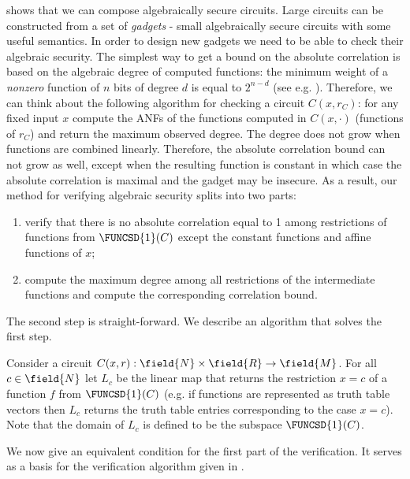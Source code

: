 
 shows that we can compose algebraically secure circuits. Large circuits can be constructed from a set of \emph{gadgets} - small algebraically secure circuits with some useful semantics. In order to design new gadgets we need to be able to check their algebraic security. The simplest way to get a bound on the absolute correlation is based on the algebraic degree of computed functions: the minimum weight of a \emph{nonzero} function of $n$ bits of degree $d$ is equal to $2^{n-d}$ (see e.g. \cite{Carlet}). Therefore, we can think about the following algorithm for checking a circuit $C(x,r_C)$: for any fixed input $x$ compute the ANFs of the functions computed in $C(x,\cdot)$ (functions of $r_C$) and return the maximum observed degree. The degree does not grow when functions are combined linearly. Therefore, the absolute correlation bound can not grow as well, except when the resulting function is constant in which case the absolute correlation is maximal and the gadget may be insecure. As a result, our method for verifying algebraic security splits into two parts:

\begin{enumerate}
    \item verify that there is no absolute correlation equal to 1 among restrictions of functions from $\FUNCSD{1}(C)$ except the constant functions and affine functions of $x$;
    \item compute the maximum degree among all restrictions of the intermediate functions and compute the corresponding correlation bound.
\end{enumerate}

The second step is straight-forward. We describe an algorithm that solves the first step.

Consider a circuit $C(x,r): \field{N}\times\field{R}\to\field{M}$.
For all $c \in \field{N}$ let $L_c$ be the linear map that returns the restriction $x=c$ of a function $f$ from $\FUNCSD{1}(C)$ (e.g. if functions are represented as truth table vectors then $L_c$ returns the truth table entries corresponding to the case $x = c$). Note that the domain of $L_c$ is defined to be the subspace $\FUNCSD{1}(C)$.

We now give an equivalent condition for the first part of the verification. It serves as a basis for the verification algorithm given in .

